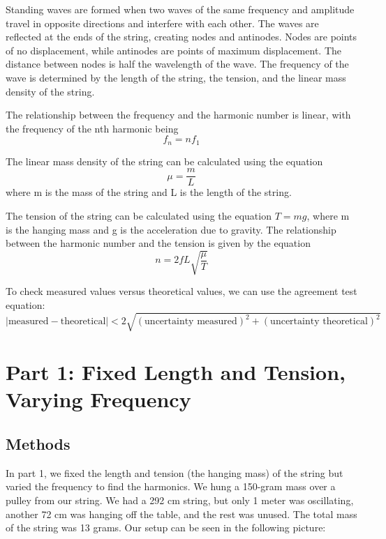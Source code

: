\documentclass[11pt]{article}
\let\oldsection\section
\renewcommand\section{\clearpage\oldsection}
\begin{document}
    Standing waves are formed when two waves of the same frequency and amplitude travel in opposite directions and interfere with each other.
    The waves are reflected at the ends of the string, creating nodes and antinodes.
    Nodes are points of no displacement, while antinodes are points of maximum displacement.
    The distance between nodes is half the wavelength of the wave.
    The frequency of the wave is determined by the length of the string, the tension, and the linear mass density of the string.

    The relationship between the frequency and the harmonic number is linear, with the frequency of the nth harmonic being
    \begin{equation}
        f_n = nf_1
        \label{eq:harmonic_frequency}
    \end{equation}

    The linear mass density of the string can be calculated using the equation
    \begin{equation}
        \mu = \frac{m}{L}
        \label{eq:linear_mass_density}
    \end{equation}
    where m is the mass of the string and L is the length of the string.

    The tension of the string can be calculated using the equation $T = mg$, where m is the hanging mass and g is the acceleration due to gravity.
    The relationship between the harmonic number and the tension is given by the equation
    \begin{equation}
        n = 2fL \sqrt{\frac{\mu}{T}}
        \label{eq:harmonic_tension}
    \end{equation}

    To check measured values versus theoretical values, we can use the agreement test equation:
    \begin{equation}
        | \text{measured} - \text{theoretical} | < 2 \sqrt{(\text{uncertainty measured})^2 + (\text{uncertainty theoretical})^2}
        \label{eq:agreement_test}
    \end{equation}

    \section{Part 1: Fixed Length and Tension, Varying Frequency}\label{sec:part_1}

    \subsection{Methods}\label{subsec:part_1_methods}
    In part 1, we fixed the length and tension (the hanging mass) of the string but varied the frequency to find the harmonics.
    We hung a 150-gram mass over a pulley from our string.
    We had a 292 cm string, but only 1 meter was oscillating, another 72 cm was hanging off the table, and the rest was unused.
    The total mass of the string was 13 grams.
    Our setup can be seen in the following picture:
\end{document}
